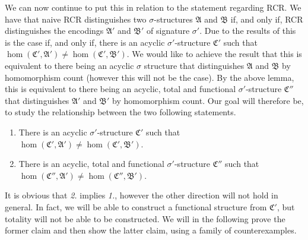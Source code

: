 We can now continue to put this in relation to the statement regarding RCR.
We have that naive RCR distinguishes two $\sigma$-structures $\mathfrak A$ and $\mathfrak B$ if, and only if, RCR distinguishes the encodings $\mathfrak A'$ and $\mathfrak B'$ of signature $\sigma'$.
Due to the results of \cite{scheidt2025ColorRefinement} this is the case if, and only if, there is an acyclic $\sigma'$-structure $\mathfrak C'$ such that $\hom(\mathfrak C',\mathfrak A')\neq\hom(\mathfrak C',\mathfrak B')$.
We would like to achieve the result that this is equivalent to there being an acyclic $\sigma$ structure that distinguishes $\mathfrak A$ and $\mathfrak B$ by homomorphism count (however this will not be the case).
By the above lemma, this is equivalent to there being an acyclic, total and functional $\sigma'$-structure $\mathfrak C''$ that distinguishes $\mathfrak A'$ and $\mathfrak B'$ by homomorphism count.
Our goal will therefore be, to study the relationship between the two following statements.
\begin{enumerate}
	\item There is an acyclic $\sigma'$-structure $\mathfrak C'$ such that $\hom(\mathfrak C',\mathfrak A')\neq\hom(\mathfrak C',\mathfrak B')$.
	\item There is an acyclic, total and functional $\sigma'$-structure $\mathfrak C''$ such that $\hom(\mathfrak C'',\mathfrak A')\neq\hom(\mathfrak C'',\mathfrak B')$.
\end{enumerate}

It is obvious that \emph{2.} implies \emph{1.}, however the other direction will not hold in general.
In fact, we will be able to construct a functional structure from $\mathfrak C'$, but totality will not be able to be constructed.
We will in the following prove the former claim and then show the latter claim, using a family of counterexamples.

